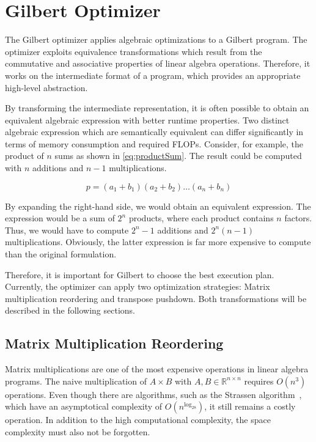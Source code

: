\chapter{Gilbert Optimizer}
\label{cha:optimizer}


The Gilbert optimizer applies algebraic optimizations to a Gilbert program.
The optimizer exploits equivalence transformations which result from the commutative and associative properties of linear algebra operations.
Therefore, it works on the intermediate format of a program, which provides an appropriate high-level abstraction.

By transforming the intermediate representation, it is often possible to obtain an equivalent algebraic expression with better runtime properties.
Two distinct algebraic expression which are semantically equivalent can differ significantly in terms of memory consumption and required FLOPs.
Consider, for example, the product of $n$ sums as shown in \cref{eq:productSum}.
The result could be computed with $n$ additions and $n-1$ multiplications.

\begin{equation}
	p = (a_1 + b_1)(a_2 + b_2)\ldots(a_n + b_n) \label{eq:productSum}
\end{equation}

By expanding the right-hand side, we would obtain an equivalent expression.
The expression would be a sum of $2^n$ products, where each product contains $n$ factors.
Thus, we would have to compute $2^n-1$ additions and $2^n(n-1)$ multiplications.
Obviously, the latter expression is far more expensive to compute than the original formulation.

Therefore, it is important for Gilbert to choose the best execution plan.
Currently, the optimizer can apply two optimization strategies: Matrix multiplication reordering and transpose pushdown.
Both transformations will be described in the following sections.

\section{Matrix Multiplication Reordering}

Matrix multiplications are one of the most expensive operations in linear algebra programs.
The naive multiplication of $A\times B$ with $A,B \in \mathbb{R}^{n \times n}$ requires $O(n^3)$ operations.
Even though there are algorithms, such as the Strassen algorithm~\cite{strassen:nm1969a}, which have an asymptotical complexity of $O(n^{\log_28})$, it still remains a costly operation.
In addition to the high computational complexity, the space complexity must also not be forgotten.

